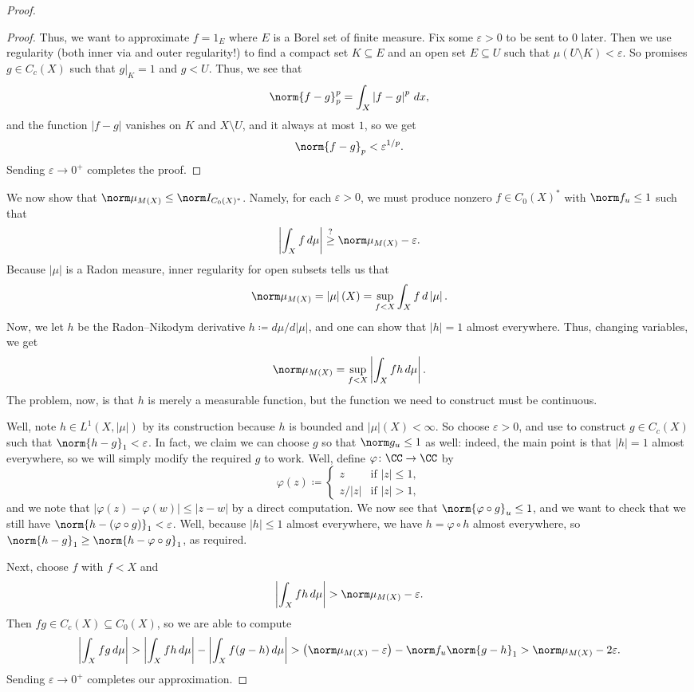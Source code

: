 \documentclass[../notes.tex]{subfiles}
\begin{document}
\begin{proof}
\begin{proof}
		Thus, we want to approximate $f=1_E$ where $E$ is a Borel set of finite measure. Fix some $\varepsilon>0$ to be sent to $0$ later. Then we use regularity (both inner via  and outer regularity!) to find a compact set $K\subseteq E$ and an open set $E\subseteq U$ such that $\mu(U\setminus K)<\varepsilon$. So  promises $g\in C_c(X)$ such that $g|_K=1$ and $g<U$. Thus, we see that
		\[\norm{f-g}_p^p=\int_X\left|f-g\right|^p\,dx,\]
		and the function $\left|f-g\right|$ vanishes on $K$ and $X\setminus U$, and it always at most $1$, so we get
		\[\norm{f-g}_p<\varepsilon^{1/p}.\]
		Sending $\varepsilon\to0^+$ completes the proof.
	\end{proof}
	We now show that $\norm\mu_{M(X)}\le\norm I_{C_0(X)^*}$. Namely, for each $\varepsilon>0$, we must produce nonzero $f\in C_0(X)^*$ with $\norm f_u\le1$ such that
	\[\left|\int_Xf\,d\mu\right|\stackrel?\ge\norm\mu_{M(X)}-\varepsilon.\]
	Because $\left|\mu\right|$ is a Radon measure, inner regularity for open subsets tells us that
	\[\norm\mu_{M(X)}=\left|\mu\right|(X)=\sup_{f<X}\int_Xf\,d\left|\mu\right|.\]
	Now, we let $h$ be the Radon--Nikodym derivative $h\coloneqq d\mu/d\left|\mu\right|$, and one can show that $\left|h\right|=1$ almost everywhere. Thus, changing variables, we get
	\[\norm\mu_{M(X)}=\sup_{f<X}\left|\int_Xfh\,d\mu\right|.\]
	The problem, now, is that $h$ is merely a measurable function, but the function we need to construct must be continuous.
	
	Well, note $h\in L^1(X,\left|\mu\right|)$ by its construction because $h$ is bounded and $\left|\mu\right|(X)<\infty$. So choose $\varepsilon>0$, and use  to construct $g\in C_c(X)$ such that $\norm{h-g}_1<\varepsilon$. In fact, we claim we can choose $g$ so that $\norm g_u\le1$ as well: indeed, the main point is that $\left|h\right|=1$ almost everywhere, so we will simply modify the required $g$ to work. Well, define $\varphi\colon\CC\to\CC$ by
	\[\varphi(z)\coloneqq\begin{cases}
		z & \text{if }\left|z\right|\le1, \\
		z/\left|z\right| & \text{if }\left|z\right|>1,
	\end{cases}\]
	and we  note that $\left|\varphi(z)-\varphi(w)\right|\le\left|z-w\right|$ by a direct computation. We now see that $\norm{\varphi\circ g}_u\le1$, and we want to check that we still have $\norm{h-(\varphi\circ g)}_1<\varepsilon$. Well, because $\left|h\right|\le1$ almost everywhere, we have $h=\varphi\circ h$ almost everywhere, so $\norm{h-g}_1\ge\norm{h-\varphi\circ g}_1$, as required.
	
	Next, choose $f$ with $f<X$ and
	\[\left|\int_Xfh\,d\mu\right|>\norm\mu_{M(X)}-\varepsilon.\]
	Then $fg\in C_c(X)\subseteq C_0(X)$, so we are able to compute
	\[\left|\int_Xfg\,d\mu\right|>\left|\int_Xfh\,d\mu\right|-\left|\int_Xf(g-h)\,d\mu\right|>\left(\norm\mu_{M(X)}-\varepsilon\right)-\norm f_u\norm{g-h}_1>\norm\mu_{M(X)}-2\varepsilon.\]
	Sending $\varepsilon\to0^+$ completes our approximation.
\end{proof}
\end{document}
